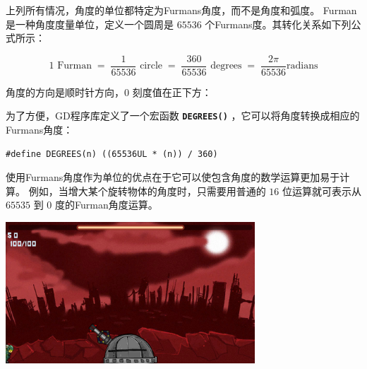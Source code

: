 \documentclass[10pt]{book}
\newcommand{\mach}[1]{\texttt{\textbf{#1}}}
\begin{document}
\begin{CJK}{UTF8}{gkai}
上列所有情况，角度的单位都特定为Furmans角度，而不是角度和弧度。
Furman是一种角度度量单位，定义一个圆周是 $65536$ 个Furmans度。其转化关系如下列公式所示：

\[
1 \text{ Furman}
\; = \;
\frac{1}{65536} \text{ circle} 
\; = \;
\frac{360}{65536} \text{ degrees}
\; = \;
\frac{2\pi}{65536} \text{radians}
\]

角度的方向是顺时针方向，$0$ 刻度值在正下方：

\begin{center}
\end{center}
为了方便，GD程序库定义了一个宏函数 \mach{DEGREES()} ，它可以将角度转换成相应的Furmans角度：
\begin{verbatim}
#define DEGREES(n) ((65536UL * (n)) / 360)
\end{verbatim}

\newpage
使用Furmans角度作为单位的优点在于它可以使包含角度的数学运算更加易于计算。
例如，当增大某个旋转物体的角度时，只需要用普通的 $16$ 位运算就可表示从 $65535$ 到 $0$ 度的Furman角度运算。

\begin{center}
\includegraphics[width=0.7\textwidth]{assets/angle.png}
\end{center}


\end{CJK}
\end{document}

